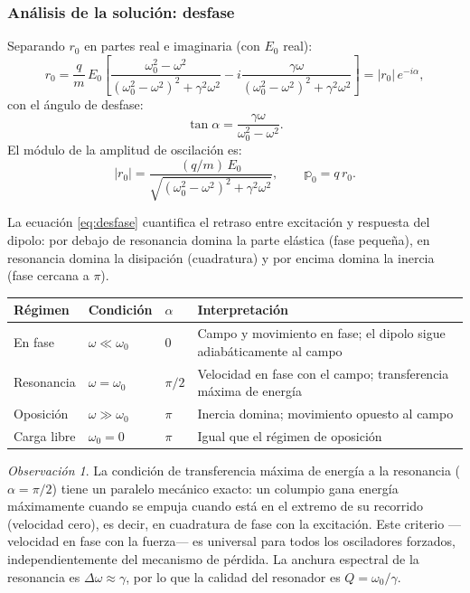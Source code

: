 \documentclass[12pt, a4paper]{article}
\theoremstyle{plain}
\theoremstyle{definition}
\theoremstyle{remark}
\newtheorem*{observacion}{Observación}
\begin{document}
\subsubsection{Análisis de la solución: desfase}

Separando $r_0$ en partes real e imaginaria (con $E_0$ real):
\[
  r_0 = \frac{q}{m}\,E_0\left[
    \frac{\omega_0^2-\omega^2}{(\omega_0^2-\omega^2)^2+\gamma^2\omega^2}
    - i\frac{\gamma\omega}{(\omega_0^2-\omega^2)^2+\gamma^2\omega^2}
  \right] = |r_0|\,e^{-i\alpha},
\]
con el ángulo de desfase:
\begin{equation}
  \tan\alpha = \frac{\gamma\omega}{\omega_0^2-\omega^2}. \label{eq:desfase}
\end{equation}
El módulo de la amplitud de oscilación es:
\begin{equation}
  |r_0| = \frac{(q/m)\,E_0}
  {\sqrt{(\omega_0^2-\omega^2)^2+\gamma^2\omega^2}},
  \qquad \mathbb{p}_0 = q\,r_0.
  \label{eq:modulo_lorentz}
\end{equation}

La ecuación \eqref{eq:desfase} cuantifica el retraso entre excitación y
respuesta del dipolo: por debajo de resonancia domina la parte elástica (fase
pequeña), en resonancia domina la disipación (cuadratura) y por encima domina
la inercia (fase cercana a $\pi$).

\medskip
\begin{center}
\begin{tabularx}{0.98\linewidth}{@{}L{2.5cm}L{2.8cm}L{1.4cm}Y@{}}
  \toprule
  Régimen & Condición & $\alpha$ & Interpretación \\
  \midrule
  En fase       & $\omega \ll \omega_0$ & $0$      & Campo y movimiento en fase; el dipolo sigue adiabáticamente al campo \\
  Resonancia    & $\omega = \omega_0$   & $\pi/2$  & Velocidad en fase con el campo; transferencia máxima de energía \\
  Oposición     & $\omega \gg \omega_0$ & $\pi$    & Inercia domina; movimiento opuesto al campo \\
  Carga libre   & $\omega_0 = 0$        & $\pi$    & Igual que el régimen de oposición \\
  \bottomrule
\end{tabularx}
\end{center}

\begin{observacion}
La condición de transferencia máxima de energía a la resonancia ($\alpha = \pi/2$)
tiene un paralelo mecánico exacto: un columpio gana energía máximamente cuando se
empuja cuando está en el extremo de su recorrido (velocidad cero), es decir, en
cuadratura de fase con la excitación. Este criterio —velocidad en fase con la
fuerza— es universal para todos los osciladores forzados, independientemente del
mecanismo de pérdida. La anchura espectral de la resonancia es $\Delta\omega \approx
\gamma$, por lo que la calidad del resonador es $Q = \omega_0/\gamma$.
\end{observacion}
\end{document}
